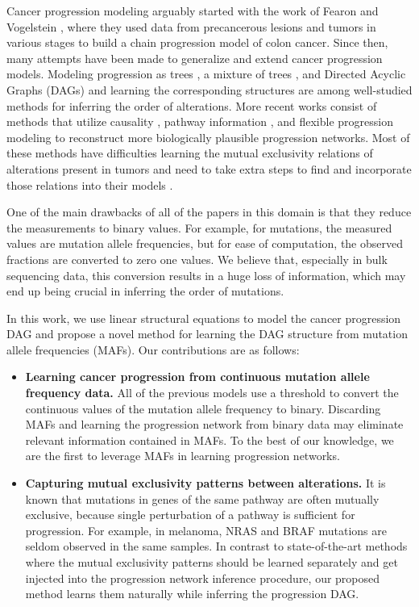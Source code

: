 \documentclass{bmcart}
\begin{document}
Cancer progression modeling arguably started with the work of Fearon and Vogelstein \cite{vogelstein1988genetic}, where they used data from precancerous lesions and tumors in various stages to build a chain progression model of colon cancer. Since then, many attempts have been made to generalize and extend cancer progression models. Modeling progression as trees \cite{desper1999inferring},  a mixture of trees \cite{beerenwinkel2005learning}, and Directed Acyclic Graphs (DAGs) \cite{beerenwinkel2007conjunctive} and learning the corresponding structures are among well-studied methods for inferring the order of alterations. More recent works consist of methods that utilize causality \cite{ramazzotti2015capri}, pathway information \cite{Gerstung2011-ul}, and flexible progression modeling \cite{nicol2020oncogenetic} to reconstruct more biologically plausible progression networks. Most of these methods have difficulties learning the mutual exclusivity relations of alterations present in tumors \cite{Cristea2017-fd} and need to take extra steps to find and incorporate those relations into their models \cite{ramazzotti2015capri, nicol2020oncogenetic}.

One of the main drawbacks of all of the papers in this domain is that they reduce the measurements to binary values. For example, for mutations, the measured values are mutation allele frequencies, but for ease of computation, the observed fractions are converted to zero one values. We believe that, especially in bulk sequencing data, this conversion results in a huge loss of information, which may end up being crucial in inferring the order of mutations. 

In this work, we use linear structural equations to model the cancer progression DAG and propose a novel method for learning the DAG structure from mutation allele frequencies (MAFs). Our contributions are as follows:
\begin{itemize}[leftmargin=*]
	\item \textbf{Learning cancer progression from continuous mutation allele frequency data.}
	All of the previous models use a threshold to convert the continuous values of the mutation allele frequency to binary. Discarding MAFs and learning the progression network from binary data may eliminate relevant information contained in MAFs. To the best of our knowledge, we are the first to leverage MAFs in learning progression networks. 
	
	\item \textbf{Capturing mutual exclusivity patterns between alterations.}
	It is known that mutations in genes of the same pathway are often mutually exclusive, because single perturbation of a pathway is sufficient for progression. For example, in melanoma, NRAS and BRAF mutations are seldom observed in the same samples. In contrast to state-of-the-art methods where the mutual exclusivity patterns should be learned separately and get injected into the progression network inference procedure, our proposed method learns them naturally while inferring the progression DAG.
\end{itemize}
\end{document}
